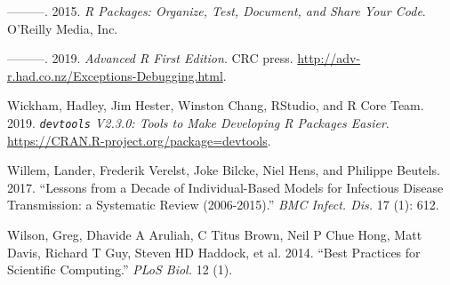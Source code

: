 \documentclass[]{elsarticle} %
\begin{document}
\leavevmode\hypertarget{ref-wickham2015r}{}%
---------. 2015. \emph{R Packages: Organize, Test, Document, and Share Your Code}. O'Reilly Media, Inc.

\leavevmode\hypertarget{ref-wickham2019advanced}{}%
---------. 2019. \emph{Advanced R First Edition}. CRC press. \url{http://adv-r.had.co.nz/Exceptions-Debugging.html}.

\leavevmode\hypertarget{ref-devtools}{}%
Wickham, Hadley, Jim Hester, Winston Chang, RStudio, and R Core Team. 2019. \emph{\texttt{devtools} V2.3.0: Tools to Make Developing R Packages Easier}. \url{https://CRAN.R-project.org/package=devtools}.

\leavevmode\hypertarget{ref-willem2017lessons}{}%
Willem, Lander, Frederik Verelst, Joke Bilcke, Niel Hens, and Philippe Beutels. 2017. ``Lessons from a Decade of Individual-Based Models for Infectious Disease Transmission: a Systematic Review (2006-2015).'' \emph{BMC Infect. Dis.} 17 (1): 612.

\leavevmode\hypertarget{ref-wilson2014best}{}%
Wilson, Greg, Dhavide A Aruliah, C Titus Brown, Neil P Chue Hong, Matt Davis, Richard T Guy, Steven HD Haddock, et al. 2014. ``Best Practices for Scientific Computing.'' \emph{PLoS Biol.} 12 (1).
\end{document}
